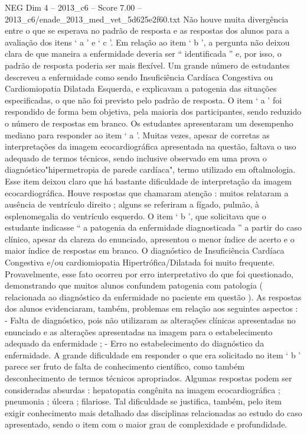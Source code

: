 \begin{textsample}{NEG Dim 4 – 2013\_c6 – Score 7.00 – 2013\_c6/enade\_2013\_med\_vet\_5d625e2f60.txt}
Não houve muita divergência entre o que se esperava no padrão de resposta e as respostas dos alunos para a avaliação dos itens ‘ a ’ e ‘ c ’.
Em relação ao item ‘ b ’, a pergunta não deixou clara de que maneira a enfermidade deveria ser “ identificada ” e, por isso, o padrão de resposta poderia ser mais flexível.
Um grande número de estudantes descreveu a enfermidade como sendo Insuficiência Cardíaca Congestiva ou Cardiomiopatia Dilatada Esquerda, e explicavam a patogenia das situações especificadas, o que não foi previsto pelo padrão de resposta.
O item ‘ a ’ foi respondido de forma bem objetiva, pela maioria dos participantes, sendo reduzido o número de respostas em branco.
Os estudantes apresentaram um desempenho mediano para responder ao item ‘ a ’.
Muitas vezes, apesar de corretas as interpretações da imagem ecocardiográfica apresentada na questão, faltava o uso adequado de termos técnicos, sendo inclusive observado em uma prova o diagnóstico"hipermetropia de parede cardíaca", termo utilizado em oftalmologia.
Esse item deixou claro que há bastante dificuldade de interpretação da imagem ecocardiográfica.
Houve respostas que chamaram atenção : muitos relataram a ausência de ventrículo direito ; alguns se referiram a fígado, pulmão, à esplenomegalia do ventrículo esquerdo.
O item ‘ b ’, que solicitava que o estudante indicasse “ a patogenia da enfermidade diagnosticada ” a partir do caso clínico, apesar da clareza do enunciado, apresentou o menor índice de acerto e o maior índice de respostas em branco.
O diagnóstico de Insuficiência Cardíaca Congestiva e/ou cardiomiopatia Hipertrófica/Dilatada foi muito frequente.
Provavelmente, esse fato ocorreu por erro interpretativo do que foi questionado, demonstrando que muitos alunos confundem patogenia com patologia ( relacionada ao diagnóstico da enfermidade no paciente em questão ).
As respostas dos alunos evidenciaram, também, problemas em relação aos seguintes aspectos : - Falta de diagnóstico, pois não utilizaram as alterações clínicas apresentadas no enunciado e as alterações apresentadas na imagem para o estabelecimento adequado da enfermidade ; - Erro no estabelecimento do diagnóstico da enfermidade.
A grande dificuldade em responder o que era solicitado no item ‘ b ’ parece ser fruto de falta de conhecimento científico, como também desconhecimento de termos técnicos apropriados.
Algumas respostas podem ser consideradas absurdas : hepatopatia congênita na imagem ecocardiográfica ; pneumonia ; úlcera ; filariose.
Tal dificuldade se justifica, também, pelo item exigir conhecimento mais detalhado das disciplinas relacionadas ao estudo do caso apresentado, sendo o item com o maior grau de complexidade e profundidade.

\end{textsample}
